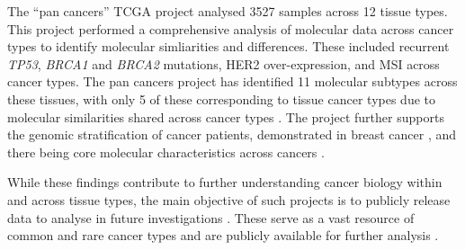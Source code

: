 The ``\glspl{pan cancer}'' \gls{TCGA} project \citep{TCGA2013PAN,TCGA2014PAN} analysed 3527 samples across 12 tissue types.  %
This project performed a comprehensive analysis of molecular data across cancer types to identify molecular simliarities and differences.
These included recurrent \textit{TP53}, \textit{BRCA1} and \textit{BRCA2} \glspl{mutation}, HER2 over-expression, and \gls{MSI} across cancer types.
The \glspl{pan cancer} project has identified 11 \glspl{molecular subtype} across these tissues, with only 5 of these corresponding to tissue cancer types due to molecular similarities shared across cancer types \citep{TCGA2014PAN} . %
The project further supports the \gls{genomic} stratification of cancer patients, demonstrated in breast cancer \citep{Perou2000, Parker2009, METABRIC2016}, and there being core molecular characteristics across cancers \citep{Hanahan2000, Hanahan2011}.

While these findings contribute to further understanding cancer biology within and across tissue types, the main objective of such projects is to publicly release data to analyse in future investigations \citep{TCGA2008GBM, TCGA2013PAN, TCGA2017web}. These serve as a vast resource of common and rare cancer types and are publicly available for further analysis \citep{cBioPortal, TCGA2017web, ICGC2011}. %


